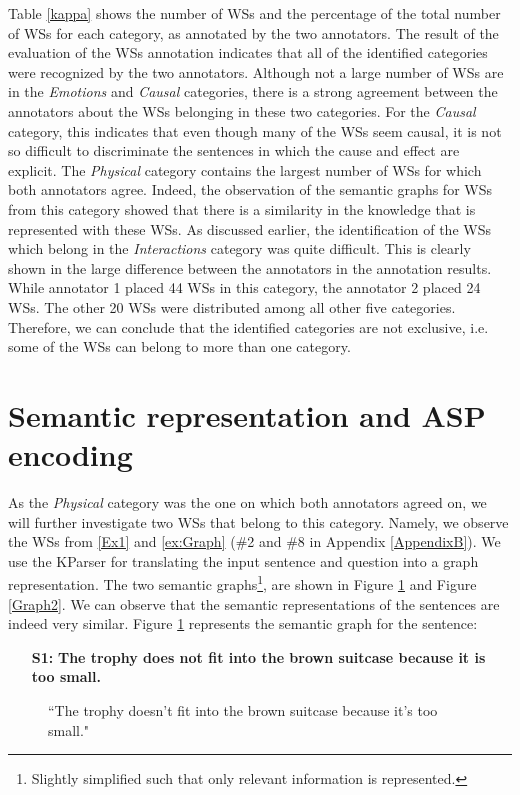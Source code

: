 Table \ref{kappa} shows the number of WSs  and the percentage of the total number of WSs for each category, as annotated by the two annotators. The result of the evaluation of the WSs annotation indicates that all of the identified categories were recognized by the two annotators. Although not a large number of WSs are in the \textit{Emotions} and \textit{Causal} categories, there is a strong agreement between the annotators about the WSs belonging in these two categories. For the \textit{Causal} category, this indicates that even though many of the WSs seem causal, it is not so difficult to discriminate the sentences in which the cause and effect are explicit. The \textit{Physical} category contains the largest number of WSs for which both annotators agree. Indeed, the observation of the semantic graphs for WSs from this category showed that there is a similarity in the knowledge that is represented with these WSs. As discussed earlier, the identification of the WSs which belong in the \textit{Interactions} category was quite difficult. This is clearly shown in the large difference between the annotators in the annotation results. While annotator 1 placed 44 WSs in this category, the annotator 2 placed 24 WSs.
The other 20 WSs were distributed among all other five categories. Therefore, we can conclude that the identified categories are not exclusive, i.e. some of the WSs can belong to more than one category. 



\section{Semantic representation and ASP encoding}
As the \textit{Physical} category was the one on which both annotators agreed on, we will further investigate two WSs that belong to this category. Namely, we observe the WSs from \ref{Ex1} and \ref{ex:Graph} (\#2 and \#8 in Appendix \ref{AppendixB}). 
We use the KParser for translating the input sentence and question into a graph representation.
The two semantic graphs\footnote{Slightly simplified such that only relevant information is represented.}, are shown in Figure \ref{Graph1} and Figure \ref{Graph2}. We can observe that the semantic representations of the sentences are indeed very similar. 
Figure \ref{Graph1} represents the semantic graph for the sentence:

\begin{itemize}
	\item[\textbf{S1:}] \textbf{The trophy does not fit into the brown suitcase because it is too small.}
\end{itemize}
\begin{figure} [h!]
	\centering
	
	\caption{\label{Graph1}``The trophy doesn't fit into the brown suitcase because it's too small."}
\end{figure}

